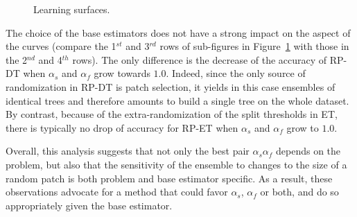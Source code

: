 \begin{figure}
\begin{center}
        \setcounter{subfigure}{3}
\caption{Learning surfaces.}
\label{fig:9:surfaces}
\end{center}
\end{figure}

The choice of the base estimators does not have a strong impact on the aspect
of the curves (compare the 1$^{st}$ and 3$^{rd}$ rows of sub-figures in
Figure~\ref{fig:9:surfaces} with those in the 2$^{nd}$ and 4$^{th}$ rows). The only
difference is the decrease of the accuracy of RP-DT when $\alpha_s$ and
$\alpha_f$ grow towards $1.0$. Indeed, since the only source of randomization in RP-DT
is patch selection, it yields in this case ensembles of identical
trees and therefore amounts to build a single tree on the whole
dataset. By contrast, because of the extra-randomization of the split
thresholds in ET, there is typically no drop of accuracy for RP-ET when $\alpha_s$
and $\alpha_f$ grow to $1.0$.

Overall, this analysis suggests that not only the best pair $\alpha_s \alpha_f$ depends
on the problem, but also that the sensitivity of the ensemble to changes to the
size of a random patch is both problem and base estimator specific. As a
result, these observations advocate for a method that could
favor $\alpha_s$, $\alpha_f$ or both, and do so
appropriately given the base estimator.

